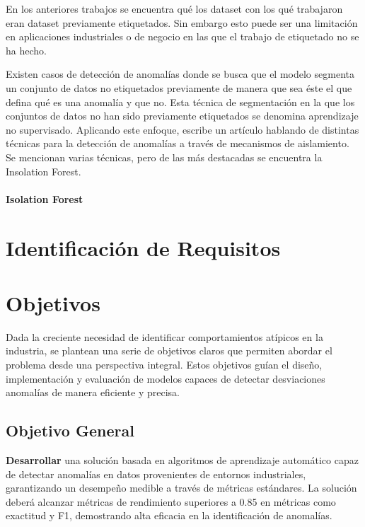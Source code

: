 \documentclass[11pt,a4paper,spanish]{book}
\numberwithin{equation}{chapter}
\numberwithin{figure}{chapter}
\begin{document}
En los anteriores trabajos se encuentra qué los dataset con los qué trabajaron eran dataset previamente etiquetados. Sin embargo esto puede ser una limitación en aplicaciones industriales o de negocio en las que el trabajo de etiquetado no se ha hecho.


Existen casos de detección de anomalías donde se busca que el modelo segmenta un conjunto de datos no etiquetados previamente de manera que sea éste el que defina qué es una anomalía y que no. Esta técnica de segmentación en la que los conjuntos de datos no han sido previamente etiquetados se denomina aprendizaje no supervisado. Aplicando este enfoque,  \cite{Cao_2025} escribe un artículo hablando de distintas técnicas para la detección de anomalías a través de mecanismos de aislamiento. Se mencionan varias técnicas, pero de las más destacadas se encuentra la Insolation Forest.


\subsubsection{Isolation Forest}




\chapter{Identificación de Requisitos}


\chapter{Objetivos}

Dada la creciente necesidad de identificar comportamientos atípicos en la industria, 
se plantean una serie de objetivos claros que permiten abordar el problema desde una 
perspectiva integral. 
Estos objetivos guían el diseño, implementación y evaluación de modelos capaces de 
detectar desviaciones anomalías de manera eficiente y precisa.


\section{Objetivo General}

\textbf{Desarrollar} una solución basada en algoritmos de aprendizaje automático 
capaz de detectar anomalías en datos provenientes de entornos industriales, garantizando
un desempeño medible a través de métricas estándares.
La solución deberá alcanzar métricas de rendimiento superiores a 0.85 en métricas como
exactitud y F1, demostrando alta eficacia en la identificación de anomalías.
\end{document}

